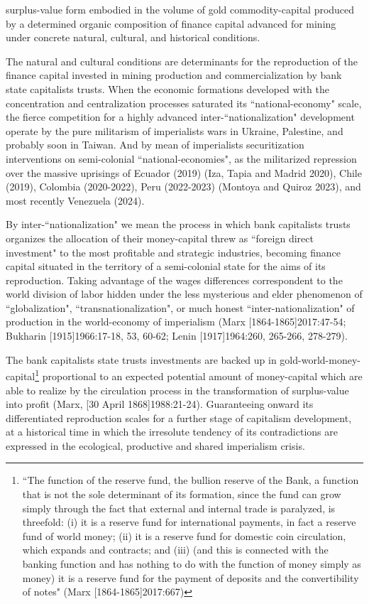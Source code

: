 \documentclass[]{interact}
\theoremstyle{plain}%
\theoremstyle{definition}
\theoremstyle{remark}
\begin{document}
surplus-value form embodied in the volume of gold commodity-capital produced by a determined organic composition of finance capital advanced for mining under concrete natural, cultural, and historical conditions. 

The natural and cultural conditions are determinants for the reproduction of the finance capital invested in mining production and commercialization by bank state capitalists trusts. When the economic formations developed with the concentration and centralization processes saturated its “national-economy" scale, the fierce competition for a highly advanced inter-“nationalization" development operate by the pure militarism of imperialists wars in Ukraine, Palestine, and probably soon in Taiwan. And by mean of imperialists securitization interventions on semi-colonial “national-economies", as the militarized repression over the massive uprisings of Ecuador (2019) (Iza, Tapia and Madrid 2020), Chile (2019), Colombia (2020-2022), Peru (2022-2023) (Montoya and Quiroz 2023), and most recently Venezuela (2024).

By inter-“nationalization" we mean the process in which bank capitalists trusts organizes the allocation of their money-capital threw as “foreign direct investment" to the most profitable and strategic industries, becoming finance capital situated in the territory of a semi-colonial state for the aims of its reproduction. Taking advantage of the wages differences correspondent to the world division of labor hidden under the less mysterious and elder phenomenon of “globalization", “transnationalization", or much honest “inter-nationalization" of production in the world-economy of imperialism (Marx [1864-1865]2017:47-54; Bukharin [1915]1966:17-18, 53, 60-62; Lenin [1917]1964:260, 265-266, 278-279).

The bank capitalists state trusts investments are backed up in gold-world-money-capital\footnote{“The function of the reserve fund, the bullion reserve of the Bank, a  function that is not the sole determinant of its formation, since the fund can  grow simply through the fact that external and internal trade is paralyzed, is  threefold: (i) it is a reserve fund for international payments, in fact a reserve  fund of world money; (ii) it is a reserve fund for domestic coin circulation, which  expands and contracts; and (iii) (and this is connected with the banking function and has nothing to do with the function of money simply as money) it is a  reserve fund for the payment of deposits and the convertibility of notes" (Marx [1864-1865]2017:667)} proportional to an expected potential amount of money-capital which are able to realize by the circulation process in the transformation of surplus-value into profit (Marx, [30 April 1868]1988:21-24). Guaranteeing onward its differentiated reproduction scales for a further stage of capitalism development, at a historical time in which the irresolute tendency of its contradictions are expressed in the ecological, productive and shared imperialism crisis.
\end{document}
